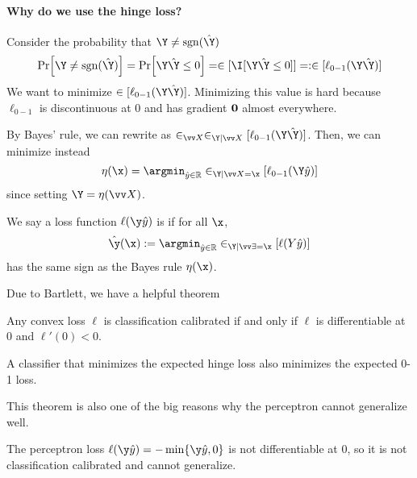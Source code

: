\documentclass[class=cs480,notes,tikz]{agony}
\begin{document}
\paragraph{Why do we use the hinge loss?}
Consider the probability that $\Y \neq \sgn(\hat \Y)$
\begin{align*}
  \Pr[\Y \neq \sgn(\hat \Y)]
  = \Pr[\Y\hat\Y \leq 0]
  = \E[\I[\Y\hat\Y \leq 0]]
  =: \E[\ell_{0-1}(\Y\hat\Y)]
\end{align*}
We want to minimize $\E[\ell_{0-1}(\Y\hat\Y)]$.
Minimizing this value is hard because $\ell_{0-1}$ is discontinuous at 0
and has gradient $\vb 0$ almost everywhere.

By Bayes' rule, we can rewrite as
$\E_{\vv X}\E_{\Y \mid \vv X}[\ell_{0-1}(\Y\hat\Y)]$.
Then, we can minimize instead
\[ \eta(\x) = \argmin_{\hat y \in \R} \E_{\Y \mid \vv X=\x}[\ell_{0-1}(\Y\hat y)] \]
since setting $\Y = \eta(\vv X)$.

\begin{defn}
  We say a loss function $\ell(\y\hat y)$ is 
  if for all $\x$,
  \[ \hat\y(\x) := \argmin_{\hat y \in \R}\E_{\Y \mid \vv \X=\x}[\ell(Y\hat y)] \]
  has the same sign as the Bayes rule $\eta(\x)$.
\end{defn}

Due to Bartlett, we have a helpful theorem
\begin{theorem}
  Any convex loss $\ell$ is classification calibrated if and only if
  $\ell$ is differentiable at 0 and $\ell'(0) < 0$.
\end{theorem}
\begin{corollary}
  A classifier that minimizes the expected hinge loss
  also minimizes the expected 0-1 loss.
\end{corollary}

This theorem is also one of the big reasons why the perceptron
cannot generalize well.

\begin{remark}
  The perceptron loss $\ell(\y\hat y) = -\min\{\y\hat y,0\}$
  is not differentiable at 0,
  so it is not classification calibrated and cannot generalize.
\end{remark}
\end{document}
